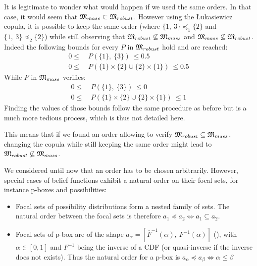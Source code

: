 \begin{example}
\begin{remark}
        It is legitimate to wonder what would happen if we used the same orders. In that case, it would seem that ${\mathfrak{M}}_{mass}\subset{\mathfrak{M}}_{robust}$. However using the \L ukasiewicz copula, it is possible to keep the same order (where $\{1,~3\} \preceq_1 \{2\}$ and $\{1,~3\} \preceq_2 \{2\}$) while still observing that ${\mathfrak{M}}_{robust}\not\subseteq {\mathfrak{M}}_{mass}$ and ${\mathfrak{M}}_{mass}\not\subseteq {\mathfrak{M}}_{robust}$. Indeed the following bounds for every $P$ in ${\mathfrak{M}}_{robust}$ hold and are reached:
        \begin{align*}
            0 \leqslant ~&P(\{1\},~ \{3\})~ \leqslant 0.5\\
            0 \leqslant ~&P(\{1\}\times\{2\}\cup\{2\}\times\{1\})~ \leqslant 0.5
        \end{align*}
        While $P$ in ${\mathfrak{M}}_{mass}$ verifies:
        \begin{align*}
            0 \leqslant ~&P(\{1\},~ \{3\})~ \leqslant 0\\
            0 \leqslant ~&P(\{1\}\times\{2\}\cup\{2\}\times\{1\})~ \leqslant 1
        \end{align*}
        Finding the values of those bounds follow the same procedure as before but is a much more tedious process, which is thus not detailed here. 
        
        This means that if we found an order allowing to verify ${\mathfrak{M}}_{robust}\subseteq {\mathfrak{M}}_{mass}$, changing the copula while still keeping the same order might lead to ${\mathfrak{M}}_{robust}\not\subseteq {\mathfrak{M}}_{mass}$.
    \end{remark}
\end{example}

We considered until now that an order has to be chosen arbitrarily. However, special cases of belief functions exhibit a natural order on their focal sets, for instance p-boxes and possibilities:
\begin{itemize}
     \item Focal sets of possibility distributions form a nested family of sets. The natural order between the focal sets is therefore $a_1\preceq a_2 \Leftrightarrow a_1 \subseteq a_2$.
    \item Focal sets of p-box are of the shape $a_\alpha = [\overline{F}^{-1}(\alpha),~\underline{F}^{-1}(\alpha)]$ (\cite{destercke_unifying_2008}), with $\alpha\in [0,1]$ and $F^{-1}$ being the inverse of a CDF (or quasi-inverse if the inverse does not exists). Thus the natural order for a p-box is $a_\alpha\preceq a_\beta \Leftrightarrow \alpha\leqslant\beta$
\end{itemize}

